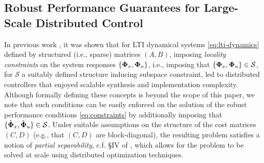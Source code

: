 
\subsection{Robust Performance Guarantees for Large-Scale Distributed Control}
\label{sec:extensions}
In previous work \cite{wang2014localized,wang2016localized,wang2018separable}, it was shown that for LTI dynamical systems \eqref{eq:lti-dynamics} defined by structured (i.e., sparse) matrices $(A,B)$, imposing \emph{locality constraints} on the system responses $\{\boldsymbol{\Phi}_x,\boldsymbol{\Phi}_u\}$, i.e., imposing that $\{\boldsymbol{\Phi}_x,\boldsymbol{\Phi}_u\} \in \mathcal{S}$, for $\mathcal{S}$ a suitably defined structure inducing subspace constraint, led to distributed controllers that enjoyed scalable synthesis and implementation complexity.  Although formally defining these concepts is beyond the scope of this paper, we note that such conditions can be easily enforced on the solution of the robust performance conditions \eqref{eq:constraints} by additionally imposing that $\{\hat{\boldsymbol{\Phi}}_x,\hat{\boldsymbol{\Phi}}_u\}\in\mathcal{S}$.   Under suitable assumptions on the structure of the cost matrices $(C,D)$ (e.g., that $(C,D)$ are block-diagonal), the resulting problem satisfies a notion of \emph{partial separability}, c.f. \S IV of \cite{wang2018separable}, which allows for the problem to be solved at scale using distributed optimization techniques.  

